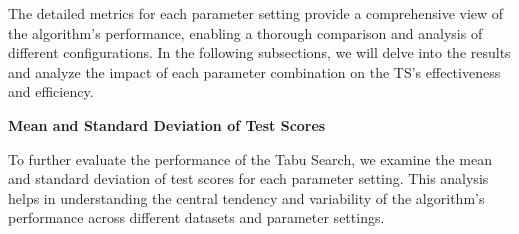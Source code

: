 \documentclass[
]{article}
\begin{document}
    The detailed metrics for each parameter setting provide a comprehensive view of the algorithm's performance, enabling a thorough comparison and analysis of different configurations. In the following subsections, we will delve into the results and analyze the impact of each parameter combination on the TS's effectiveness and efficiency.

    \textbf{Mean and Standard Deviation of Test Scores}

    To further evaluate the performance of the Tabu Search, we examine the mean and standard deviation of test scores for each parameter setting. This analysis helps in understanding the central tendency and variability of the algorithm's performance across different datasets and parameter settings.

    \begin{table}[H]
        \centering
\end{table}
\end{document}
